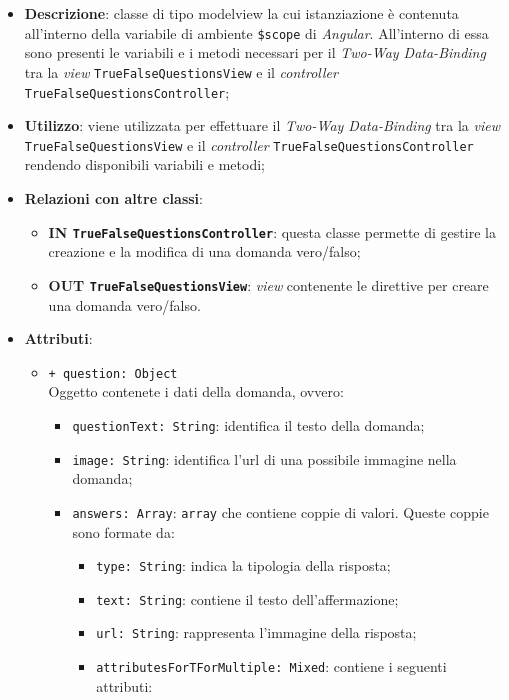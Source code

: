 \begin{itemize}
	\item \textbf{Descrizione}: classe di tipo modelview la cui istanziazione è contenuta all'interno della variabile di ambiente \texttt{\$scope} di \textit{Angular}. All'interno di essa sono presenti le variabili e i metodi necessari per il \textit{Two-Way Data-Binding} tra la \textit{view} \texttt{TrueFalseQuestionsView} e il \textit{controller} \texttt{TrueFalseQuestionsController}; 
	\item \textbf{Utilizzo}: viene utilizzata per effettuare il \textit{Two-Way Data-Binding} tra la \textit{view}\\ \texttt{TrueFalseQuestionsView} e il \textit{controller} \texttt{TrueFalseQuestionsController} rendendo disponibili variabili e metodi;
	\item \textbf{Relazioni con altre classi}:
	\begin{itemize}
		\item \textbf{IN \texttt{TrueFalseQuestionsController}}: questa classe permette di gestire la creazione e la modifica di una domanda vero/falso;
		\item \textbf{OUT \texttt{TrueFalseQuestionsView}}: \textit{view} contenente le direttive per creare una domanda vero/falso.
	\end{itemize}
	\item \textbf{Attributi}:
	\begin{itemize}
	  \item \texttt{+ question: Object} \\ Oggetto contenete i dati della domanda, ovvero:
	  \begin{itemize}
		\item \texttt{questionText: String}: identifica il testo della domanda;
		\item \texttt{image: String}: identifica l'url di una possibile immagine nella domanda;
		\item \texttt{answers: Array}: \texttt{array} che contiene coppie di valori. Queste coppie sono formate da:
		\begin{itemize}
			\item \texttt{type: String}: indica la tipologia della risposta;
			\item \texttt{text: String}: contiene il testo dell'affermazione;
			\item \texttt{url: String}: rappresenta l'immagine della risposta;
			\item \texttt{attributesForTForMultiple: Mixed}: contiene i seguenti attributi:

\end{itemize}
\end{itemize}
\end{itemize}
\end{itemize}
